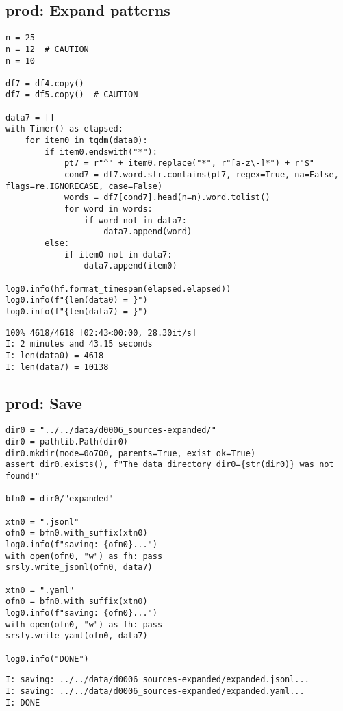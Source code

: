 \documentclass[a4paper,10pt,onecolumn,oneside,openright]{article}
\begin{document}
\subsection{prod: Expand patterns}
\label{sec:org502c2ed}
\begin{verbatim}
n = 25
n = 12  # CAUTION
n = 10

df7 = df4.copy()
df7 = df5.copy()  # CAUTION

data7 = []
with Timer() as elapsed:
    for item0 in tqdm(data0):
        if item0.endswith("*"):
            pt7 = r"^" + item0.replace("*", r"[a-z\-]*") + r"$"
            cond7 = df7.word.str.contains(pt7, regex=True, na=False, flags=re.IGNORECASE, case=False)
            words = df7[cond7].head(n=n).word.tolist()
            for word in words:
                if word not in data7:
                    data7.append(word)
        else:
            if item0 not in data7:
                data7.append(item0)

log0.info(hf.format_timespan(elapsed.elapsed))
log0.info(f"{len(data0) = }")
log0.info(f"{len(data7) = }")
\end{verbatim}

\begin{verbatim}
100% 4618/4618 [02:43<00:00, 28.30it/s]
I: 2 minutes and 43.15 seconds
I: len(data0) = 4618
I: len(data7) = 10138
\end{verbatim}

\subsection{prod: Save}
\label{sec:orgac4d904}
\begin{verbatim}
dir0 = "../../data/d0006_sources-expanded/"
dir0 = pathlib.Path(dir0)
dir0.mkdir(mode=0o700, parents=True, exist_ok=True)
assert dir0.exists(), f"The data directory dir0={str(dir0)} was not found!"

bfn0 = dir0/"expanded"

xtn0 = ".jsonl"
ofn0 = bfn0.with_suffix(xtn0)
log0.info(f"saving: {ofn0}...")
with open(ofn0, "w") as fh: pass
srsly.write_jsonl(ofn0, data7)

xtn0 = ".yaml"
ofn0 = bfn0.with_suffix(xtn0)
log0.info(f"saving: {ofn0}...")
with open(ofn0, "w") as fh: pass
srsly.write_yaml(ofn0, data7)

log0.info("DONE")
\end{verbatim}

\begin{verbatim}
I: saving: ../../data/d0006_sources-expanded/expanded.jsonl...
I: saving: ../../data/d0006_sources-expanded/expanded.yaml...
I: DONE
\end{verbatim}
\end{document}
